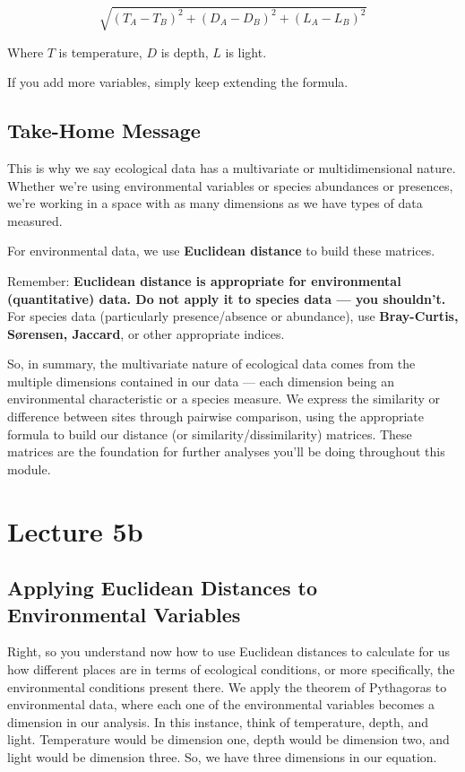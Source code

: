 \documentclass[
  10pt,
]{book}
\begin{document}
\[
\sqrt{(T_A - T_B)^2 + (D_A - D_B)^2 + (L_A - L_B)^2}
\]

Where \(T\) is temperature, \(D\) is depth, \(L\) is light.

If you add more variables, simply keep extending the formula.

\section{Take-Home Message}\label{take-home-message}

This is why we say ecological data has a multivariate or
multidimensional nature. Whether we're using environmental variables or
species abundances or presences, we're working in a space with as many
dimensions as we have types of data measured.

For environmental data, we use \textbf{Euclidean distance} to build
these matrices.

Remember: \textbf{Euclidean distance is appropriate for environmental
(quantitative) data. Do not apply it to species data --- you shouldn't.}
For species data (particularly presence/absence or abundance), use
\textbf{Bray-Curtis, Sørensen, Jaccard}, or other appropriate indices.

So, in summary, the multivariate nature of ecological data comes from
the multiple dimensions contained in our data --- each dimension being
an environmental characteristic or a species measure. We express the
similarity or difference between sites through pairwise comparison,
using the appropriate formula to build our distance (or
similarity/dissimilarity) matrices. These matrices are the foundation
for further analyses you'll be doing throughout this module.

\chapter*{Lecture 5b}\label{lecture-5b}

\section{Applying Euclidean Distances to Environmental
Variables}\label{applying-euclidean-distances-to-environmental-variables}

Right, so you understand now how to use Euclidean distances to calculate
for us how different places are in terms of ecological conditions, or
more specifically, the environmental conditions present there. We apply
the theorem of Pythagoras to environmental data, where each one of the
environmental variables becomes a dimension in our analysis. In this
instance, think of temperature, depth, and light. Temperature would be
dimension one, depth would be dimension two, and light would be
dimension three. So, we have three dimensions in our equation.
\end{document}
